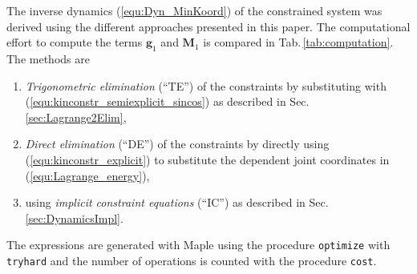 \documentclass{svproc}
\newcommand{\bm}[1]{\boldsymbol{#1}}
\begin{document}
The inverse dynamics (\ref{equ:Dyn_MinKoord}) of the constrained system was derived using the different approaches presented in this paper.
The computational effort to compute the terms $\bm{g}_1$ and $\bm{M}_1$ is compared in Tab.\,\ref{tab:computation}.
The methods are 
%
\begin{enumerate}
    \item \emph{Trigonometric elimination} (``TE'') of the constraints by substituting with (\ref{equ:kinconstr_semiexplicit_sincos}) as described in Sec.\,\ref{sec:Lagrange2Elim}, 
    \item \emph{Direct elimination} (``DE'') of the constraints by directly using (\ref{equ:kinconstr_explicit}) to substitute the dependent joint coordinates in (\ref{equ:Lagrange_energy}),
    \item using \emph{implicit constraint equations} (``IC'') as described in Sec.\,\ref{sec:DynamicsImpl}.
\end{enumerate}
%
The expressions are generated with Maple using the procedure \texttt{optimize} with \texttt{tryhard} and the number of operations is counted with the procedure \texttt{cost}.
%
\end{document}
